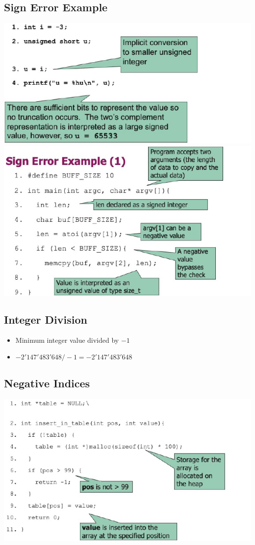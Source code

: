 \subsection{Sign Error Example}
\includegraphics[width=\linewidth]{../img/sign_error.png}
\includegraphics[width=\linewidth]{../img/sign_error2.png}

\subsection{Integer Division}
\begin{itemize}
    \item Minimum integer value divided by $-1$
    \item $-2'147'483'648 / -1 = -2'147'483'648$
\end{itemize}

\subsection{Negative Indices}
\includegraphics[width=\linewidth]{../img/negative_indices.png}

